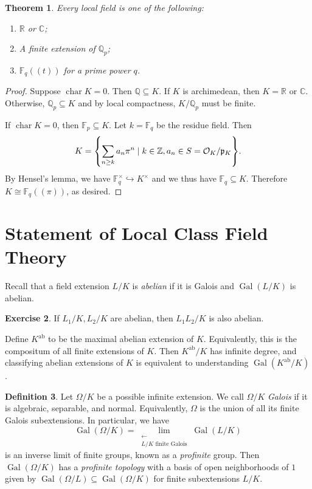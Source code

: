 \documentclass[leqno, openany]{memoir}
\newtheorem{thm}{Theorem}[section]
\theoremstyle{definition}
\newtheorem{defn}[thm]{Definition}
\newtheorem{exer}[thm]{Exercise}
\theoremstyle{remark}
\theoremstyle{plain}
\theoremstyle{definition}
\theoremstyle{remark}
\newcommand{\R}{\mathbb{R}}
\newcommand{\F}{\mathbb{F}}
\newcommand{\C}{\mathbb{C}}
\newcommand{\Z}{\mathbb{Z}}
\newcommand{\Q}{\mathbb{Q}}
\newcommand{\mc}[1]{\mathcal{#1}}
\newcommand{\mf}[1]{\mathfrak{#1}}
\newcommand{\mr}[1]{\mathrm{#1}}
\DeclareMathOperator{\Gal}{Gal}
\begin{document}
\begin{thm} Every local field is one of the following: \begin{enumerate} \item
$\R$ or $\C$; \item A finite extension of $\Q_p$; \item $\F_q((t))$ for a prime
power $q$.  \end{enumerate} \end{thm}

\begin{proof} Suppose $\operatorname{char} K = 0$. Then $\Q \subseteq K$. If
    $K$ is archimedean, then $K = \R$ or $\C$. Otherwise, $\Q_p \subseteq K$
    and by local compactness, $K/\Q_p$ must be finite.

    If $\operatorname{char} K = 0$, then $\F_p \subseteq K$. Let $k = \F_q$ be
    the residue field. Then \[ K = \qty{\sum_{n \geq k} a_n \pi^n \mid k \in
    \Z, a_n \in S = \mc{O}_K / \mf{p}_K}. \] By Hensel's lemma, we have
    $\F_q^{\times} \hookrightarrow K^{\times}$ and we thus have $\F_q \subseteq
    K$. Therefore $K \cong \F_q((\pi))$, as desired.  \end{proof}

\section{Statement of Local Class Field Theory}%
\label{cha:local_class_field_theory}

Recall that a field extension $L/K$ is \textit{abelian} if it is Galois and
$\Gal(L/K)$ is abelian.

\begin{exer} If $L_1/K, L_2/K$ are abelian, then $L_1 L_2 / K$ is also abelian.
\end{exer}

Define $K^{\mr{ab}}$ to be the maximal abelian extension of $K$. Equivalently,
this is the compositum of all finite extensions of $K$. Then $K^{\mr{ab}}/K$
has infinite degree, and classifying abelian extensions of $K$ is equivalent to
understanding $\Gal(K^{\mr{ab}}/K)$.

\begin{defn} Let $\Omega /K$ be a possible infinite extension. We call
    $\Omega/K$ \textit{Galois} if it is algebraic, separable, and normal.
    Equivalently, $\Omega$ is the union of all its finite Galois subextensions.
    In particular, we have \[ \Gal(\Omega/K) = \lim_{\substack{\longleftarrow
    \\ L/K \text{ finite Galois}}} \Gal(L/K) \] is an inverse limit of finite
    groups, known as a \textit{profinite} group. Then $\Gal(\Omega / K)$ has a
    \textit{profinite topology} with a basis of open neighborhoods of $1$ given
    by $\Gal(\Omega / L) \subseteq \Gal(\Omega / K)$ for finite subextensions
    $L/K$.  \end{defn}
\end{document}
